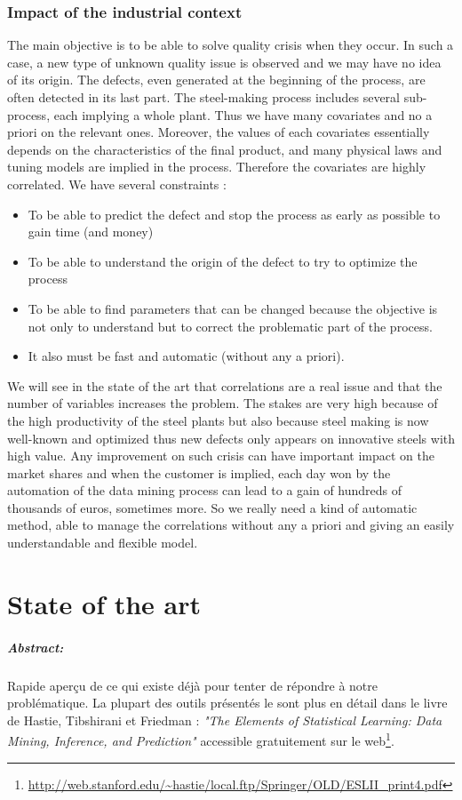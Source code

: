 \documentclass[12pt,a4paper]{report}
\begin{document}
	\subsection{Impact of the industrial context}
	 The main objective is to be able to solve quality crisis when they occur. In such a case, a new type of unknown quality issue is observed and we may have no idea of its origin. The defects, even generated at the beginning of the process, are often detected in its last part. The steel-making process includes several sub-process, each implying a whole plant. Thus we have many covariates and no a priori on the relevant ones. Moreover, the values of each covariates essentially depends on the characteristics of the final product, and many physical laws and tuning models are implied in the process. Therefore the covariates are highly correlated.
	We have several constraints :
	\begin{itemize}
		\item To be able to predict the defect and stop the process as early as possible to gain time (and money)
		\item To be able to understand the origin of the defect to try to optimize the process
		\item To be able to find parameters that can be changed because the objective is not only to understand but to correct the problematic part of the process.
		\item It also must be fast and automatic (without any a priori).
	\end{itemize}
	We will see in the state of the art that correlations are a real issue and that the number of variables increases the problem.	
	The stakes are very high because of the high productivity of the steel plants but also because steel making is now well-known and optimized thus new defects only appears on innovative steels with high value. Any improvement on such crisis can have important impact on the market shares and when the customer is implied, each day won by the automation of the data mining process can lead to a gain of hundreds of thousands of euros, sometimes more. So we really need a kind of automatic method, able to manage the correlations without any a priori and giving an easily understandable and flexible model.
	
\chapter{State of the art}
\paragraph{Abstract:} Rapide aperçu de ce qui existe déjà pour tenter de répondre à notre problématique. La plupart des outils présentés le sont plus en détail dans le livre de Hastie, Tibshirani et Friedman : {\it "The Elements of Statistical Learning: Data Mining, Inference, and Prediction" } accessible gratuitement sur le web\footnote{ \url{http://web.stanford.edu/~hastie/local.ftp/Springer/OLD/ESLII_print4.pdf}}.
\end{document}
